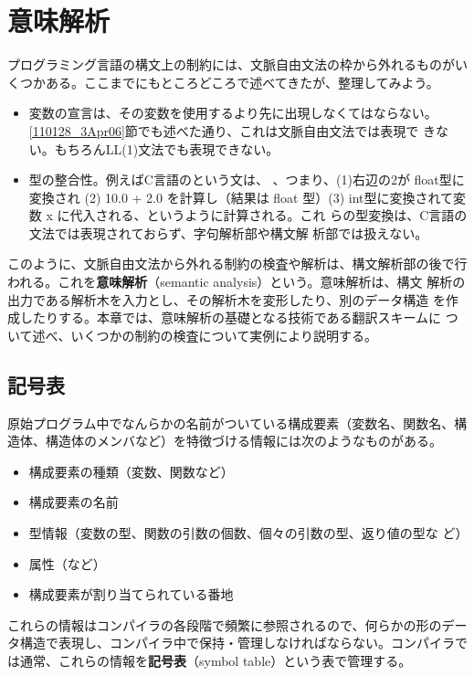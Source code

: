 
\chapter{意味解析}

プログラミング言語の構文上の制約には、文脈自由文法の枠から外れるものがい
くつかある。ここまでにもところどころで述べてきたが、整理してみよう。
\begin{itemize}
 \item 変数の宣言は、その変数を使用するより先に出現しなくてはならない。
       \ref{110128_3Apr06}節でも述べた通り、これは文脈自由文法では表現で
       きない。もちろんLL(1)文法でも表現できない。
       \label{132708_10Apr06}
 \item 型の整合性。例えばC言語のという文は、
       、つまり、(1)右辺の2が
       float型に変換され (2) 10.0 + 2.0 を計算し（結果は float 型）(3)
       int型に変換されて変数 x に代入される、というように計算される。これ
       らの型変換は、C言語の文法では表現されておらず、字句解析部や構文解
       析部では扱えない。
\end{itemize}

このように、文脈自由文法から外れる制約の検査や解析は、構文解析部の後で行
われる。これを{\bf 意味解析}（semantic analysis）という。意味解析は、構文
解析の出力である解析木を入力とし、その解析木を変形したり、別のデータ構造
を作成したりする。本章では、意味解析の基礎となる技術である翻訳スキームに
ついて述べ、いくつかの制約の検査について実例により説明する。

\section{記号表}

原始プログラム中でなんらかの名前がついている構成要素（変数名、関数名、構
造体、構造体のメンバなど）を特徴づける情報には次のようなものがある。
\begin{itemize}
 \item 構成要素の種類（変数、関数など）
 \item 構成要素の名前
 \item 型情報（変数の型、関数の引数の個数、個々の引数の型、返り値の型な
       ど）
 \item 属性（など）
 \item 構成要素が割り当てられている番地
\end{itemize}
これらの情報はコンパイラの各段階で頻繁に参照されるので、何らかの形のデー
タ構造で表現し、コンパイラ中で保持・管理しなければならない。コンパイラで
は通常、これらの情報を{\bfseries 記号表}（symbol table）という表で管理する。

